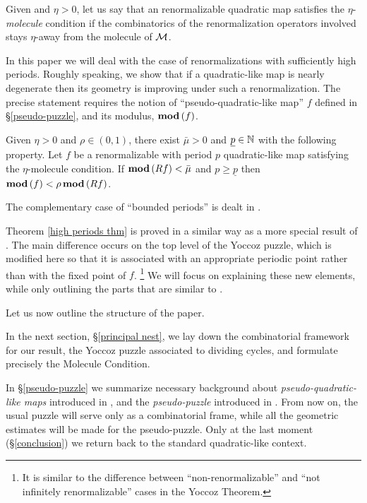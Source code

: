 Given and $\eta>0$,
let us say that an renormalizable  quadratic map satisfies the $\eta$-{\it molecule} condition
if the combinatorics of the renormalization operators involved stays $\eta$-away from 
the molecule of ${\mathcal M}$. 
 
In this paper we will deal with the case of renormalizations with sufficiently high periods.
Roughly speaking, we show that if  a quadratic-like map is nearly degenerate 
then its geometry is improving under such a renormalization.
The precise statement requires the notion of  ``pseudo-quadratic-like map'' $f$
defined in  \S \ref{pseudo-puzzle}, and its modulus, ${ \mathbf{mod}\, }(f)$.                   %

\begin{thm}\label{high periods thm}
 Given  $\eta>0$ and $\rho\in (0,1)$, 
 there exist $\bar\mu>0$ and $\underline p\in {\mathbb N}$ with the following property.  
Let  $f$ be a renormalizable with period $p$ quadratic-like map
satisfying the $\eta$-molecule condition.
If ${ \mathbf{mod}\, }(Rf)<\bar\mu$ and $p\geq \underline p$ 
then ${ \mathbf{mod}\, }(f) < \rho\, { \mathbf{mod}\, } (Rf)$.
\end{thm} 

The complementary case of ``bounded periods'' is dealt in \cite{K}.
 
\begin{rem}
  Theorem \ref{high periods thm} is proved in a similar way as a more special  result of \cite{decorations}.
The main difference occurs on the top level of the Yoccoz puzzle, which is modified here
so that it is associated with an appropriate periodic point rather than with the fixed point of $f$.%
\footnote{It is similar to the difference between ``non-renormalizable'' and ``not infinitely renormalizable''
cases in the Yoccoz Theorem.} 
We will focus on explaining these new elements, while only outlining the parts
that are similar to \cite{decorations}.     
\end{rem}


Let us now outline the structure of the paper.

In the next section, \S \ref{principal nest}, we lay down the combinatorial framework
for our result, the Yoccoz puzzle associated to dividing cycles, 
and formulate precisely the Molecule Condition. 

In \S \ref{pseudo-puzzle} we summarize necessary background about
{\it pseudo-quadratic-like maps} introduced in \cite{K}, 
and the {\it pseudo-puzzle} introduced in \cite{decorations}.
From now on, the usual puzzle will serve only as a combinatorial frame,
while all the geometric estimates will be made for the pseudo-puzzle.
 Only at the last moment (\S \ref{conclusion})
we return back to the standard quadratic-like context.


